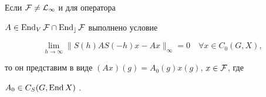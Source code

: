  


\begin{lem} Если $\cal F\ne L_\infty$ и для оператора 


$A\in\operatorname{End}_V\cal F\cap\operatorname{End}_c\cal F$ выполнено условие 


\begin{equation} 


\lim_{h\to\infty}\|S(h)AS(-h)x-Ax\|_\infty=0 


\quad \forall x\in C_0(G,X), 


\end{equation} 


то он представим в виде $(Ax)(g)=A_0(g)x(g)$, $x\in\cal F$, где 


$A_0\in C_S(G,\operatorname{End} X)$ . 


\end{lem} 


 


